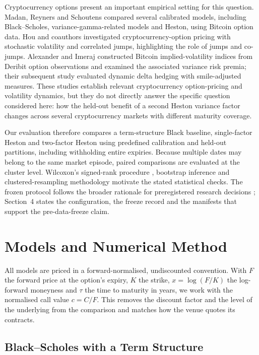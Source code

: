 \documentclass[runningheads]{llncs}
\begin{document}
Cryptocurrency options present an important empirical setting for this
question. Madan, Reyners and Schoutens \cite{madan2019} compared several
calibrated models, including Black--Scholes, variance-gamma-related models and
Heston, using Bitcoin option data. Hou and coauthors \cite{hou2020}
investigated cryptocurrency-option pricing with stochastic volatility and
correlated jumps, highlighting the role of jumps and co-jumps. Alexander and
Imeraj \cite{alexander2021} constructed Bitcoin implied-volatility indices from
Deribit option observations and examined the associated variance risk premia;
their subsequent study \cite{alexander2023} evaluated dynamic delta hedging
with smile-adjusted measures. These studies establish relevant cryptocurrency
option-pricing and volatility dynamics, but they do not directly answer the
specific question considered here: how the held-out benefit of a second Heston
variance factor changes across several cryptocurrency markets with different
maturity coverage.

Our evaluation therefore compares a term-structure Black baseline,
single-factor Heston and two-factor Heston using predefined calibration and
held-out partitions, including withholding entire expiries. Because multiple
dates may belong to the same market episode, paired comparisons are evaluated
at the cluster level. Wilcoxon's signed-rank procedure \cite{wilcoxon1945},
bootstrap inference \cite{efron1979} and clustered-resampling methodology
\cite{cameron2008} motivate the stated statistical checks. The frozen protocol
follows the broader rationale for preregistered research decisions
\cite{nosek2018}; Section~4 states the configuration, the freeze record and the
manifests that support the pre-data-freeze claim.

\section{Models and Numerical Method}

All models are priced in a forward-normalised, undiscounted convention. With
$F$ the forward price at the option's expiry, $K$ the strike,
$x=\log(F/K)$ the log-forward moneyness and $\tau$ the time to maturity in
years, we work with the normalised call value $c = C/F$. This removes the
discount factor and the level of the underlying from the comparison and matches
how the venue quotes its contracts.

\subsection{Black--Scholes with a Term Structure}
\end{document}
